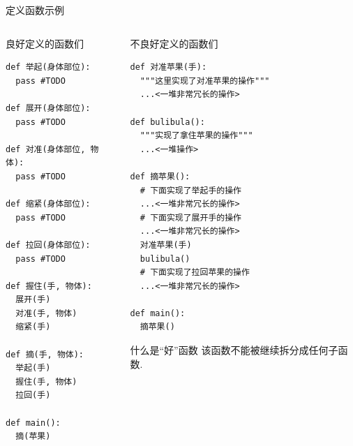 \documentclass{beamer}
\begin{document}
    \begin{frame}[fragile]{定义函数示例}
      \begin{columns}
        \begin{column}{0.4\textwidth}
          \begin{block}{\tiny 良好定义的函数们}
            \begin{lstlisting}
def 举起(身体部位):
  pass #TODO   

def 展开(身体部位):
  pass #TODO 

def 对准(身体部位, 物体):
  pass #TODO 

def 缩紧(身体部位):
  pass #TODO 

def 拉回(身体部位):
  pass #TODO 

def 握住(手, 物体):
  展开(手)
  对准(手, 物体)
  缩紧(手)

def 摘(手, 物体):
  举起(手)
  握住(手, 物体)
  拉回(手)

def main():
  摘(苹果)
            \end{lstlisting}
          \end{block}
        \end{column}
        \begin{column}{0.4\textwidth}
          \begin{block}{\tiny 不良好定义的函数们}
            \begin{lstlisting}
def 对准苹果(手):
  """这里实现了对准苹果的操作"""
  ...<一堆非常冗长的操作>

def bulibula():
  """实现了拿住苹果的操作"""
  ...<一堆操作>

def 摘苹果():
  # 下面实现了举起手的操作
  ...<一堆非常冗长的操作>
  # 下面实现了展开手的操作
  ...<一堆非常冗长的操作>
  对准苹果(手)
  bulibula()
  # 下面实现了拉回苹果的操作
  ...<一堆非常冗长的操作>

def main():
  摘苹果()
            \end{lstlisting}
          \end{block}
          \begin{block}{\tiny 什么是``好''函数}\tiny
            该函数不能被继续拆分成任何子函数. 
          \end{block}
        \end{column}
      \end{columns}
    \end{frame}
\end{document}
